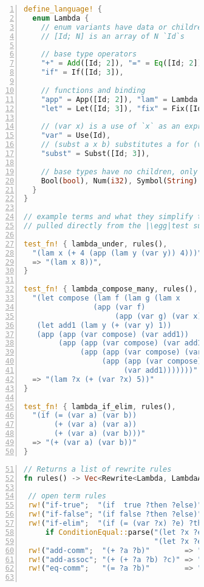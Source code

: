 \begin{figure}
\begin{subfigure}[t]{0.48\linewidth}
  \begin{lstlisting}[language=Rust, basicstyle=\tiny\ttfamily, numbers=left, escapechar=|,
   xleftmargin=13pt,
   numbersep=7pt,
]
define_language! {
  enum Lambda {
    // enum variants have data or children (eclass Ids)
    // [Id; N] is an array of N `Id`s

    // base type operators
    "+" = Add([Id; 2]), "=" = Eq([Id; 2]),
    "if" = If([Id; 3]),

    // functions and binding
    "app" = App([Id; 2]), "lam" = Lambda([Id; 2]),
    "let" = Let([Id; 3]), "fix" = Fix([Id; 2]),

    // (var x) is a use of `x` as an expression
    "var" = Use(Id),
    // (subst a x b) substitutes a for (var x) in b
    "subst" = Subst([Id; 3]),

    // base types have no children, only data
    Bool(bool), Num(i32), Symbol(String),
  }
}

// example terms and what they simplify to
// pulled directly from the |\egg|test suite

test_fn! { lambda_under, rules(),
  "(lam x (+ 4 (app (lam y (var y)) 4)))"
  => "(lam x 8))",
}

test_fn! { lambda_compose_many, rules(),
  "(let compose (lam f (lam g (lam x
                (app (var f)
                     (app (var g) (var x))))))
   (let add1 (lam y (+ (var y) 1))
   (app (app (var compose) (var add1))
        (app (app (var compose) (var add1))
             (app (app (var compose) (var add1))
                  (app (app (var compose) (var add1))
                       (var add1)))))))"
  => "(lam ?x (+ (var ?x) 5))"
}

test_fn! { lambda_if_elim, rules(),
  "(if (= (var a) (var b))
       (+ (var a) (var a))
       (+ (var a) (var b)))"
  => "(+ (var a) (var b))"
}\end{lstlisting}
\end{subfigure}
\hfill
\begin{subfigure}[t]{0.48\linewidth}
  \begin{lstlisting}[language=Rust, basicstyle=\tiny\ttfamily, escapechar=|, numbers=left, firstnumber=51,
  numbersep=7pt,
]
// Returns a list of rewrite rules
fn rules() -> Vec<Rewrite<Lambda, LambdaAnalysis>> { vec![

 // open term rules
 rw!("if-true";  "(if  true ?then ?else)" => "?then"),
 rw!("if-false"; "(if false ?then ?else)" => "?else"),
 rw!("if-elim";  "(if (= (var ?x) ?e) ?then ?else)" => "?else"
     if ConditionEqual::parse("(let ?x ?e ?then)",
                              "(let ?x ?e ?else)")),
 rw!("add-comm";  "(+ ?a ?b)"        => "(+ ?b ?a)"),
 rw!("add-assoc"; "(+ (+ ?a ?b) ?c)" => "(+ ?a (+ ?b ?c))"),
 rw!("eq-comm";   "(= ?a ?b)"        => "(= ?b ?a)"),


\end{lstlisting}
\end{subfigure}
\end{figure}
